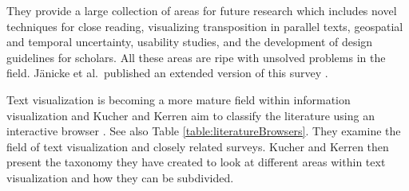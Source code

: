 %

They provide a large collection of areas for future research which includes novel techniques for close reading, visualizing transposition in parallel texts, geospatial and temporal uncertainty, usability studies, and the development of design guidelines for scholars. All these areas are ripe with unsolved problems in the field. J{\"a}nicke et al.\ published an extended version of this survey \cite{janicke2016visual}.

Text visualization is becoming a more mature field within information visualization and Kucher and Kerren aim to classify the literature using an interactive browser \cite{kucher2015text}. See also Table \ref{table:literatureBrowsers}.
They examine the field of text visualization and closely related surveys. Kucher and Kerren then present the taxonomy they have created to look at different areas within text visualization and how they can be subdivided.

